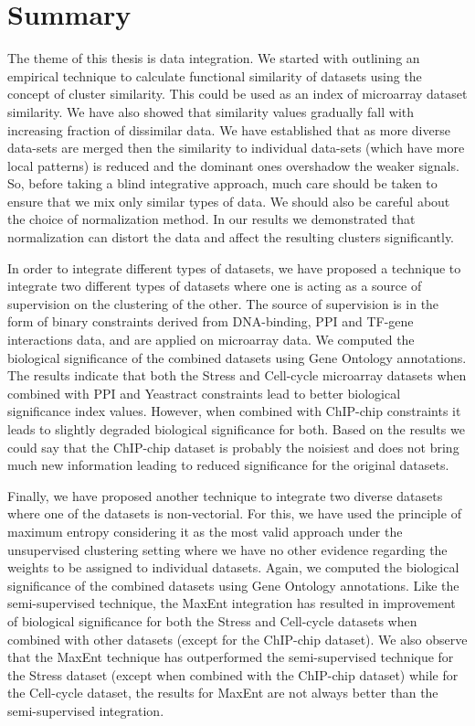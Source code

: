 \section{Summary}
The theme of this thesis is data integration. We started with outlining an empirical technique to calculate functional similarity of datasets using the concept of cluster similarity. This could be used as an index of microarray dataset similarity. We have also showed that similarity values gradually fall with increasing fraction of dissimilar data. We have established that as more diverse data-sets are merged then the similarity to individual data-sets (which have more local patterns) is reduced and the dominant ones overshadow the weaker signals. So, before taking a blind integrative approach, much care should be taken to ensure that we mix only similar types of data. We should also be careful about the choice of normalization method. In our results we demonstrated that normalization can distort the data and affect the resulting clusters significantly.

In order to integrate different types of datasets, we have proposed a technique to integrate two different types of  datasets where one is acting as a source of supervision on the clustering of the other. The source of supervision is in the form of binary constraints derived from DNA-binding, PPI and TF-gene interactions data, and are applied on microarray data. We computed the biological significance of the combined datasets using Gene Ontology annotations. The results indicate that both the Stress and Cell-cycle microarray datasets when combined with PPI and Yeastract constraints lead to better biological significance index values. However, when combined with ChIP-chip constraints it leads to slightly degraded biological significance for both. Based on the results we could say that the ChIP-chip dataset is probably the noisiest and does not bring much new information leading to reduced significance for the original datasets. 

Finally, we have proposed another technique to integrate two diverse datasets where one of the datasets is non-vectorial. For this, we have used the principle of maximum entropy considering it as the most valid approach under the unsupervised clustering setting where we have no other evidence regarding the weights to be assigned to individual datasets. Again, we computed the biological significance of the combined datasets using Gene Ontology annotations. Like the semi-supervised technique, the MaxEnt integration has resulted in improvement of biological significance for both the Stress and Cell-cycle datasets when combined with other datasets (except for the ChIP-chip dataset). We also observe that the MaxEnt technique has outperformed the semi-supervised technique for the Stress dataset (except when combined with the ChIP-chip dataset) while for the Cell-cycle dataset, the results for MaxEnt are not always better than the semi-supervised integration. 

